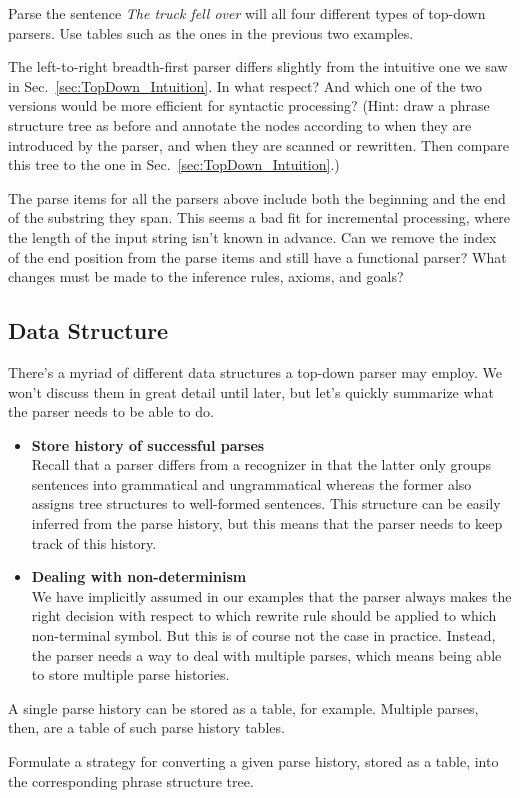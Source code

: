 %
\begin{exercise}
    Parse the sentence \emph{The truck fell over} will all four different types of top-down parsers.
    Use tables such as the ones in the previous two examples.
\end{exercise}
%
\begin{exercise}
    The left-to-right breadth-first parser differs slightly from the intuitive one we saw in Sec.~\ref{sec:TopDown_Intuition}.
    In what respect?
    And which one of the two versions would be more efficient for syntactic processing?
    (Hint: draw a phrase structure tree as before and annotate the nodes according to when they are introduced by the parser, and when they are scanned or rewritten.
    Then compare this tree to the one in Sec.~\ref{sec:TopDown_Intuition}.)
\end{exercise}
%
\begin{exercise}
    The parse items for all the parsers above include both the beginning and the end of the substring they span.
    This seems a bad fit for incremental processing, where the length of the input string isn't known in advance.
    Can we remove the index of the end position from the parse items and still have a functional parser?
    What changes must be made to the inference rules, axioms, and goals?
\end{exercise}

\subsection{Data Structure}
\label{sub:TopDown_Data}
There's a myriad of different data structures a top-down parser may employ.
We won't discuss them in great detail until later, but let's quickly summarize what the parser needs to be able to do.
%
\begin{itemize}
    \item \textbf{Store history of successful parses}\\
        Recall that a parser differs from a recognizer in that the latter only groups sentences into grammatical and ungrammatical whereas the former also assigns tree structures to well-formed sentences.
        This structure can be easily inferred from the parse history, but this means that the parser needs to keep track of this history.
    \item \textbf{Dealing with non-determinism}\\
        We have implicitly assumed in our examples that the parser always makes the right decision with respect to which rewrite rule should be applied to which non-terminal symbol.
        But this is of course not the case in practice.
        Instead, the parser needs a way to deal with multiple parses, which means being able to store multiple parse histories.
\end{itemize}
%
A single parse history can be stored as a table, for example.
Multiple parses, then, are a table of such parse history tables.
%
\begin{exercise}
    Formulate a strategy for converting a given parse history, stored as a table, into the corresponding phrase structure tree.
\end{exercise}

